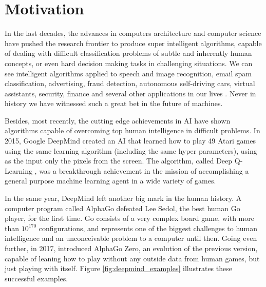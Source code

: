 \section{Motivation}


In the last decades, the advances in computers architecture and computer science have pushed the research frontier to produce super intelligent algorithms, capable of dealing with difficult classification problems of subtle and inherently human concepts, or even hard decision making tasks in challenging situations. We can see intelligent algorithms applied to speech and image recognition, email spam classification, advertising, fraud detection, autonomous self-driving cars, virtual assistants, security, finance and several other applications in our lives \cite{AIapplications}. Never in history we have witnessed such a great bet in the future of machines.


Besides, most recently, the cutting edge achievements in AI have shown algorithms capable of overcoming top human intelligence in difficult problems. In 2015, Google DeepMind created an AI that learned how to play 49 Atari games using the same learning algorithm (including the same hyper parameters), using as the input only the pixels from the screen. The algorithm, called Deep Q-Learning \cite{RLNature2015}, was a breakthrough achievement in the mission of accomplishing a general purpose machine learning agent in a wide variety of games.

In the same year, DeepMind left another big mark in the human history. A computer program called AlphaGo defeated Lee Sedol, the best human Go player, for the first time. Go consists of a very complex board game, with more than $10^{170}$ configurations, and represents one of the biggest challenges to human intelligence and an unconceivable problem to a computer until then. Going even further, in 2017, \cite{AlphaGoZero} introduced AlphaGo Zero, an evolution of the previous version, capable of leaning how to play without any outside data from human games, but just playing with itself. Figure \ref{fig:deepmind_examples} illustrates these successful examples.

